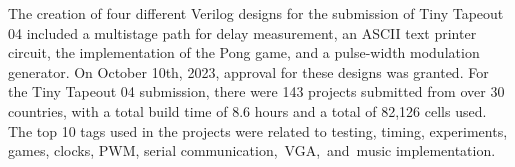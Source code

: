 

The creation of four different Verilog designs for the submission of Tiny Tapeout 04 included a multistage path for delay measurement, an ASCII text printer circuit, the implementation of the Pong game, and a pulse-width modulation generator. On October 10th, 2023, approval for these designs was granted. For the Tiny Tapeout 04 submission, there were 143 projects submitted from over 30 countries, with a total build time of 8.6 hours and a total of 82,126 cells used. The top 10 tags used in the projects were related to testing, timing, experiments, games, clocks, PWM, serial communication, VGA, and music implementation.